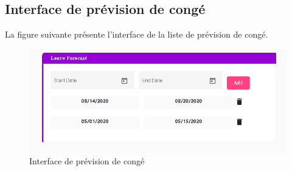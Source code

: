 \subsection{Interface de prévision de congé}
\hspace{4mm}La figure suivante présente l’interface de la liste de prévision de congé.
\begin{figure}[h]
    \centering
    \includegraphics[scale=0.65]{figures/a5.png}
    \caption{Interface de prévision de congé}
    \label{fig:interface_congé}
\end{figure}\newpage
